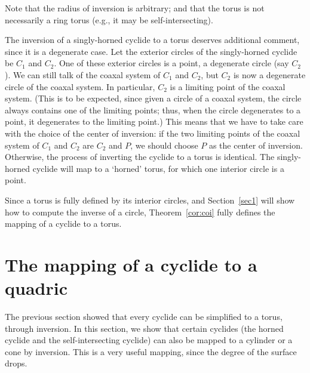 
\begin{rmk}
Note that the radius of inversion is arbitrary;
and that the torus is not necessarily a ring torus (e.g., it may be 
self-intersecting).
\end{rmk}

\begin{rmk}
The inversion of a singly-horned cyclide to a torus deserves additional 
comment, since it is a degenerate case.
Let the exterior circles of the singly-horned cyclide be $C_1$ and $C_2$.
One of these exterior circles is a point, a degenerate circle (say $C_2$).
We can still talk of the coaxal system of $C_1$ and $C_2$,
but $C_2$ is now a degenerate circle of the coaxal system.
In particular, $C_2$ is a limiting point of the coaxal system.
(This is to be expected, since given a circle of a coaxal system,
the circle always contains one of the limiting points; thus, when 
the circle degenerates to a point, it degenerates to the limiting point.)
This means that we have to take care with the choice 
of the center of inversion: if the two limiting points of 
the coaxal system of $C_1$ and $C_2$ are $C_2$ and 
$P$, we should choose $P$ as the center of inversion.
Otherwise, the process of inverting the cyclide to a torus is identical.
The singly-horned cyclide will map to a `horned' torus, for which one
interior circle is a point.
\end{rmk}

Since a torus is fully defined by its interior circles, and Section~\ref{sec1}
will show how to compute the inverse of a circle,
Theorem~\ref{cor:coi} fully defines the mapping of a cyclide to a torus.



\section{The mapping of a cyclide to a quadric}
\label{sec:toquadric}

The previous section showed that every cyclide can be simplified 
to a torus, through inversion.
In this section, we show that certain cyclides (the horned cyclide 
and the self-intersecting cyclide) can also be mapped to a cylinder or a cone
by inversion.
This is a very useful mapping, since the degree of the surface drops.

